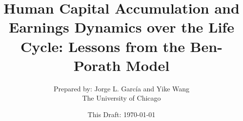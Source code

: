 \documentclass[12pt]{article}
\begin{document}
\title{Human Capital Accumulation and Earnings Dynamics over the Life Cycle: Lessons from the Ben-Porath Model}
\author{Prepared by: Jorge L. Garc\'{i}a and Yike Wang \\ The University of Chicago}
\date{This Draft: \today}
\maketitle
\clearpage




\clearpage


\end{document}
